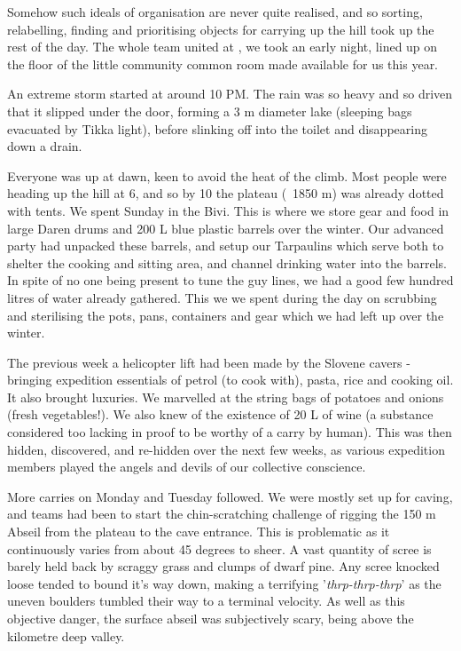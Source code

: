 Somehow such ideals of organisation are never quite realised, and so sorting, relabelling, finding and prioritising objects for carrying up the hill took up the rest of the day. The whole team united at , we took an early night, lined up on the floor of the little community common room made available for us this year. 

An extreme storm started at around 10 PM. The rain was so heavy and so driven that it slipped under the door, forming a 3 m diameter lake (sleeping bags evacuated by Tikka light), before slinking off into the toilet and disappearing down a drain.

Everyone was up at dawn, keen to avoid the heat of the climb. Most people were heading up the hill at 6, and so by 10 the plateau (~1850 m) was already dotted with tents. We spent Sunday in the Bivi. This is where we store gear and food in large Daren drums and 200 L blue plastic barrels over the winter. Our advanced party had unpacked these barrels, and setup our Tarpaulins which serve both to shelter the cooking and sitting area, and channel drinking water into the barrels. In spite of no one being present to tune the guy lines, we had a good few hundred litres of water already gathered. This we we spent during the day on scrubbing and sterilising the pots, pans, containers and gear which we had left up over the winter. 

The previous week a helicopter lift had been made by the Slovene cavers - bringing expedition essentials of petrol (to cook with), pasta, rice and cooking oil. It also brought luxuries. We marvelled at the string bags of potatoes and onions (fresh vegetables!). We also knew of the existence of 20 L of wine (a substance considered too lacking in proof to be worthy of a carry by human). This was then hidden, discovered, and re-hidden over the next few weeks, as various expedition members played the angels and devils of our collective conscience. 

More carries on Monday and Tuesday followed. We were mostly set up for caving, and teams had been to start the chin-scratching challenge of rigging the 150 m Abseil from the plateau to the cave entrance. This is problematic as it continuously varies from about 45 degrees to sheer. A vast quantity of scree is barely held back by scraggy grass and clumps of dwarf pine. Any scree knocked loose tended to bound it's way down, making a terrifying '\emph{thrp-thrp-thrp}' as the uneven boulders tumbled their way to a terminal velocity. As well as this objective danger, the surface abseil was subjectively scary, being above the kilometre deep  valley. 

